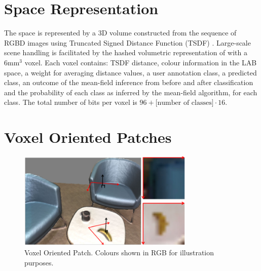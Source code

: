 \documentclass{llncs}
\begin{document}
%     
%     
%     
%     
%     
   


\section{Space Representation}
   
  The space is represented by a 3D volume constructed from the sequence of RGBD images using Truncated Signed Distance Function (TSDF) \cite{TSDF}. Large-scale scene handling is facilitated by the hashed volumetric representation of \cite{hashed_voxel} with a 6mm$^{3}$ voxel. Each voxel contains: TSDF distance, colour information in the LAB space, a weight for averaging distance values, a user annotation class, a predicted class, an outcome of the mean-field inference from before and after classification and the probability of each class as inferred by the mean-field algorithm, for each class. The total number of bits per voxel is $96 + \textrm{[number of classes]} \cdot 16$.

\section{Voxel Oriented Patches}

\begin{figure}
 \center
 \includegraphics[width=0.75\textwidth]{figures/vop}
 \caption{Voxel Oriented Patch. Colours shown in RGB for illustration purposes.}
 \label{fig:vop}
\end{figure}
\end{document}
